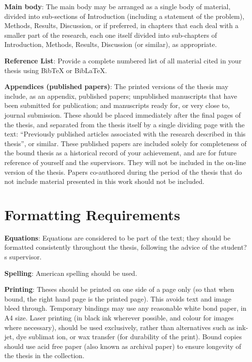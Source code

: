 \textbf{Main body}:  The main body may be arranged as a single body of material, divided into sub-sections of Introduction (including a statement of the problem), Methods, Results, Discussion, or if preferred, in chapters that each deal with a smaller part of the research, each one itself divided into sub-chapters of Introduction, Methods, Results, Discussion (or similar), as appropriate. 

\textbf{Reference List}:  Provide a complete numbered list of all material cited in your thesis using BibTeX or BibLaTeX.

\textbf{Appendices (published papers)}: The printed versions of the thesis may include, as an appendix, published papers; unpublished manuscripts that have been submitted for publication; and manuscripts ready for, or very close to, journal submission.  These should be placed immediately after the final pages of the thesis, and separated from the thesis itself by a single dividing page with the text: ``Previously published articles associated with the research described in this thesis'', or similar. These published papers are included solely for completeness of the bound thesis as a historical record of your achievement, and are for future reference of yourself and the supervisors.  They will not be included in the on-line version of the thesis. Papers co-authored during the period of the thesis that do not include material presented in this work should not be included.

\section{Formatting Requirements}

\textbf{Equations}: Equations are considered to be part of the text; they should be formatted consistently throughout the thesis, following the advice of the student?s supervisor.  

\textbf{Spelling}: American spelling should be used.

\textbf{Printing}:  Theses should be printed on one side of a page only (so that when bound, the right hand page is the printed page).  This avoids text and image bleed through.  Temporary bindings may use any reasonable white bond paper, in A4 size.  Laser printing (in black ink wherever possible, and colour for images where necessary), should be used exclusively, rather than alternatives such as ink-jet, dye sublimat ion, or wax transfer (for durability of the print).  Bound copies should use acid free paper (also known as archival paper) to ensure longevity of the thesis in the collection.

